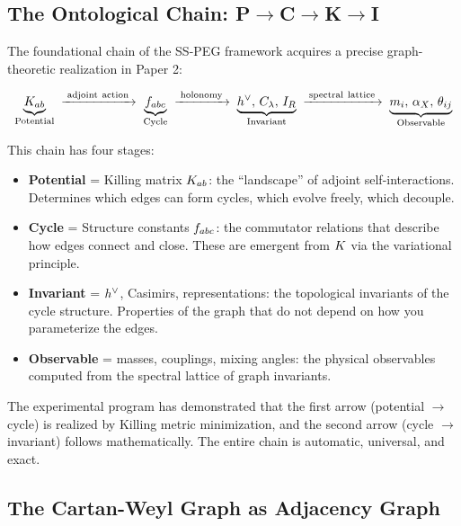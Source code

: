 \subsection{The Ontological Chain: P$\to$C$\to$K$\to$I}\label{sec:onological_chain}

The foundational chain of the SS-PEG framework acquires a precise graph-theoretic realization in Paper 2:

\begin{equation}
\underbrace{K_{ab}}_{\text{Potential}} \;\xrightarrow{\;\mathrm{adjoint\ action}\;}\; \underbrace{f_{abc}}_{\text{Cycle}} \;\xrightarrow{\;\mathrm{holonomy}\;}\; \underbrace{h^\vee, \, C_\lambda, \, I_R}_{\text{Invariant}} \;\xrightarrow{\;\mathrm{spectral\ lattice}\;}\; \underbrace{m_i, \, \alpha_X, \, \theta_{ij}}_{\text{Observable}}
\end{equation}

This chain has four stages:

\begin{itemize}
    \item \textbf{Potential} = Killing matrix $K_{ab}$: the ``landscape'' of adjoint self-interactions. Determines which edges can form cycles, which evolve freely, which decouple.
    
    \item \textbf{Cycle} = Structure constants $f_{abc}$: the commutator relations that describe how edges connect and close. These are emergent from $K$ via the variational principle.
    
    \item \textbf{Invariant} = $h^\vee$, Casimirs, representations: the topological invariants of the cycle structure. Properties of the graph that do not depend on how you parameterize the edges.
    
    \item \textbf{Observable} = masses, couplings, mixing angles: the physical observables computed from the spectral lattice of graph invariants.
\end{itemize}

The experimental program has demonstrated that the first arrow (potential $\to$ cycle) is realized by Killing metric minimization, and the second arrow (cycle $\to$ invariant) follows mathematically. The entire chain is automatic, universal, and exact.

\subsection{The Cartan-Weyl Graph as Adjacency Graph}\label{sec:cartan_weyl_graph}

